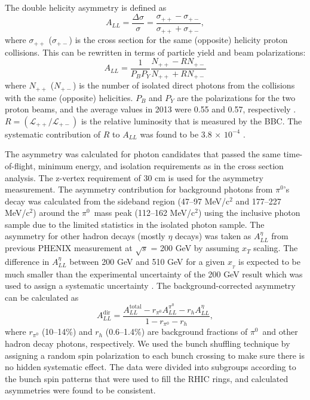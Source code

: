 \documentclass[twocolumn,letterpaper,aps,prl,longbibliography,superscriptaddress,floatfix]{revtex4-2}
\newcommand{\pizero}{\ensuremath{\pi^0}}
\begin{document}
The double helicity asymmetry is defined as
\begin{equation} \label{eq:all}
A_{LL} = \frac{\Delta\sigma}{\sigma} = \frac{\sigma_{++}-\sigma_{+-}}{\sigma_{++}+\sigma_{+-}},
\end{equation}
where $\sigma_{++}$ ($\sigma_{+-}$) is the cross section for the same (opposite) helicity proton collisions. This can be rewritten in terms of particle yield and beam polarizations:
\begin{equation}
A_{LL} = \frac{1}{P_BP_Y} \frac{N_{++}-RN_{+-}}{N_{++}+RN_{+-}}
\end{equation}
where $N_{++}$ ($N_{+-}$) is the number of isolated direct photons from the collisions with the same (opposite) helicities. $P_{B}$ and $P_{Y}$ are the polarizations for the two proton beams, and the average values in 2013 were 0.55 and 0.57, respectively \cite{POBLAGUEV2020164261}. $R = (\mathcal{L_{++}}/\mathcal{L_{+-}})$ is the relative luminosity that is measured by the BBC. The systematic contribution of $R$ to $A_{LL}$ was found to be 3.8 $\times$ $10^{-4}$ \cite{PhysRevD.93.011501}.

The asymmetry was calculated for photon candidates that passed the same time-of-flight, minimum energy, and isolation requirements as in the cross section analysis. The z-vertex requirement of 30 cm is used for the asymmetry measurement. The asymmetry contribution for background photons from \pizero's decay was calculated from the sideband region (47--97 MeV/c$^2$ and 177--227 MeV/c$^2$) around the \pizero\ mass peak (112--162 MeV/c$^2$) using the inclusive photon sample due to the limited statistics in the isolated photon sample. The asymmetry for other hadron decays (mostly $\eta$ decays) was taken as $A_{LL}^{\eta}$ from previous PHENIX measurement at $\sqrt{s}$ = 200 GeV \cite{PhysRevD.90.012007} by assuming $x_T$ scaling. The difference in $A^{\eta}_{LL}$ between 200 GeV and 510 GeV for a given $x_{_{T}}$ is expected to be much smaller than the experimental uncertainty of the 200 GeV result which was used to assign a systematic uncertainty \cite{PhysRevLett.113.012001, 2014276}. The background-corrected asymmetry can be calculated as
\begin{equation} \label{eq:all-dir}
A_{LL}^{\text{dir}} = \frac{A_{LL}^{\text{total}} - r_{\pi^0}A_{LL}^{\pi^0} -r_h A_{LL}^{\eta}}{1 - r_{\pi^0} - r_h},
\end{equation}
where $r_{\pi^0}$ (10--14\%) and $r_h$ (0.6--1.4\%) are background fractions of \pizero\ and other hadron decay photons, respectively. We used the bunch shuffling technique by assigning a random spin polarization to each bunch crossing to make sure there is no hidden systematic effect. The data were divided into subgroups according to the bunch spin patterns that were used to fill the RHIC rings, and calculated asymmetries were found to be consistent.
\end{document}
